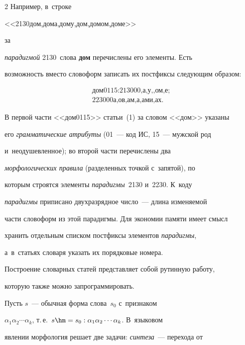 \begin{multicols}{2}
     Например, в~строке 

     

     <<2130дом,дома,дому,дом,домом,доме>> 

     

     \noindent

     за 

\textit{парадигмой} 2130~слова \textbf{дом} перечислены его элементы. Есть 

возможность вместо словоформ записать их постфиксы следующим образом:

     \begin{multline}

      \mbox{дом0115:213000,а,у,,ом,е;}\\

      \mbox{223000а,ов,ам,а,ами,ах}.

      \label{e1-shi}

      \end{multline}

      

     В первой части <<дом0115>> статьи~(1) за словом <<дом>> указаны 

его \textit{грамматические атрибуты} (01~--- код ИС, 15~--- мужской род 

и~неодушевленное); во второй части перечислены два 

\textit{морфологических правила} (разделенных точкой с~запятой), по 

которым строятся элементы \textit{парадигмы}~2130 и~2230. К~коду 

\textit{парадигмы} приписано двухразрядное число~--- длина изменяемой 

части словоформ из этой парадигмы. Для экономии памяти имеет смысл 

хранить отдельным списком постфиксы элементов \textit{парадигмы}, 

а~в~статьях словаря указать их порядковые номера. 

     

     Построение словарных статей представляет собой рутинную работу, 

которую также можно запрограммировать.

     

     Пусть $s$~--- обычная форма слова~${s}_0$ с~признаком 

$\alpha_1\alpha_2\cdots \alpha_k$, т.\,е.\ $s \hm= s_0:\alpha_1\alpha_2\cdots\alpha_k$. В~языковом 

явлении морфология решает две задачи: \textit{синтеза}~--- перехода от 


\end{multicols}
